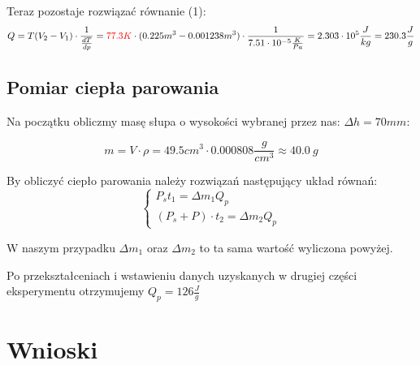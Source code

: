 \documentclass{article}
\begin{document}
Teraz pozostaje rozwiązać równanie (1):
\begin{equation}
	Q = T(V_2-V_1) \cdot \frac{1}{\frac{dT}{dp}} = \textcolor{red}{77.3K} \cdot (0.225 m^3 - 0.001238 m^3) \cdot \frac{1}{7.51 \cdot 10^{-5} \frac{K}{Pa}} = 2.303 \cdot 10^{5} \frac{J}{kg} = 230.3 \frac{J}{g}
\end{equation}

\subsection{Pomiar ciepła parowania}
Na początku obliczmy masę słupa o wysokości wybranej przez nas: $\Delta h = 70 mm$:

\begin{equation}
	m = V \cdot \rho = 49.5 cm^3 \cdot 0.000808 \frac{g}{cm^3} \approx 40.0 \:g
\end{equation}

By obliczyć ciepło parowania należy rozwiązań następujący układ równań:
\begin{equation}
	\begin{cases}
	P_s t_1 = \Delta m_1 Q_p \\
	(P_s + P) \cdot t_2 = \Delta m_2 Q_p
	\end{cases}
\end{equation}

W naszym przypadku $\Delta m_1$ oraz $\Delta m_2$ to ta sama wartość wyliczona powyżej.

Po przekształceniach i wstawieniu danych uzyskanych w drugiej części eksperymentu otrzymujemy $Q_p = 126 \frac{J}{g}$
\section{Wnioski}






\end{document}
